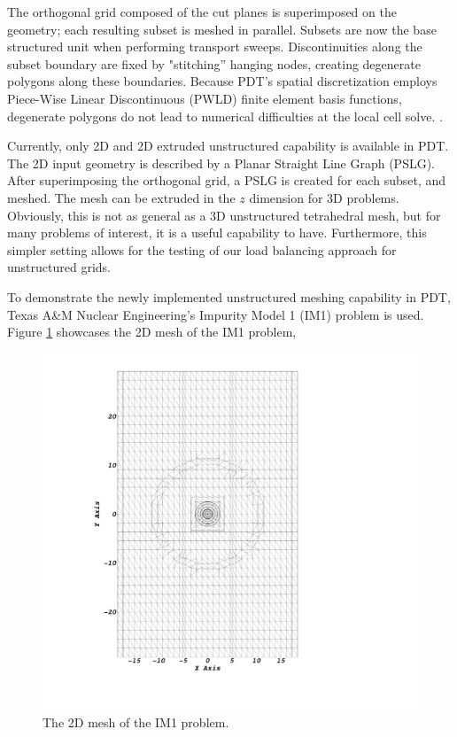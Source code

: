 \documentclass{anstrans}
\begin{document}
The orthogonal grid composed of the cut planes is superimposed on the geometry; each resulting subset is meshed in parallel.  Subsets are now the base structured unit when performing transport sweeps. Discontinuities along the subset boundary are fixed by "stitching'' hanging nodes, creating degenerate polygons along these boundaries. Because PDT's spatial discretization employs Piece-Wise Linear Discontinuous (PWLD) finite element basis functions, degenerate polygons do not lead to numerical difficulties at the local cell solve. \cite{pwld_teresa,pwld_ragusa}.

Currently, only 2D and 2D extruded unstructured capability is available in PDT. The 2D input geometry is described by a Planar Straight Line Graph (PSLG). After superimposing the orthogonal grid, a PSLG is created for each subset, and meshed. The mesh can be extruded in the $z$ dimension for 3D problems. Obviously, this is not as general as a 3D unstructured tetrahedral mesh, but for many problems of interest, it is a useful capability to have. Furthermore, this simpler setting allows for the testing of our load balancing approach for unstructured grids.

To demonstrate the newly implemented unstructured meshing capability in PDT, Texas A\&M Nuclear Engineering's Impurity Model 1 (IM1) problem is used. Figure \ref{IM12D} showcases the 2D mesh of the IM1 problem,
\begin{figure}[H]
\centering
\includegraphics[scale = 0.13, trim=28cm  4cm 0cm 4cm,clip]{figures/im12d.png}
\caption{The 2D mesh of the IM1 problem.}
\label{IM12D}
\end{figure}
\end{document}
